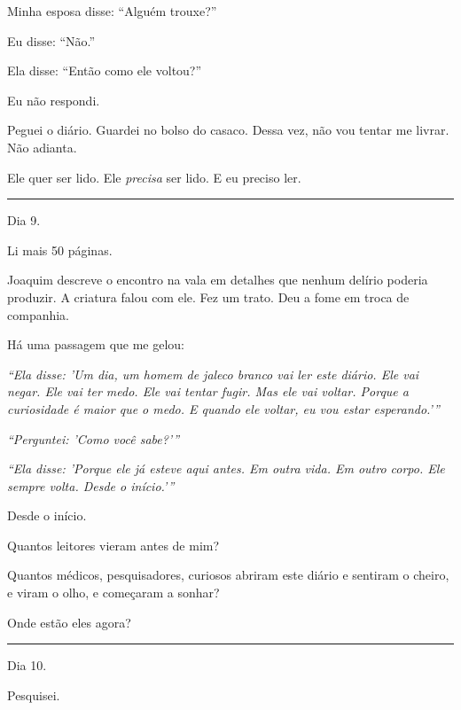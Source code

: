 \noindent Minha esposa disse: \textquotedblleft{}Alguém trouxe?\textquotedblright{}

\noindent Eu disse: \textquotedblleft{}Não.\textquotedblright{}

\noindent Ela disse: \textquotedblleft{}Então como ele voltou?\textquotedblright{}

\noindent Eu não respondi.

\noindent Peguei o diário. Guardei no bolso do casaco. Dessa vez, não vou tentar me livrar. Não adianta.

\noindent Ele quer ser lido.
Ele \textit{precisa} ser lido.
E eu preciso ler.

\vspace{0.5em}\noindent\rule{\textwidth}{0.5pt}\vspace{0.5em}

\noindent Dia 9.

\noindent Li mais 50 páginas.

\noindent Joaquim descreve o encontro na vala em detalhes que nenhum delírio poderia produzir. A criatura falou com ele. Fez um trato. Deu a fome em troca de companhia.

\noindent Há uma passagem que me gelou:

\noindent \textit{\textquotedblleft{}Ela disse: 'Um dia, um homem de jaleco branco vai ler este diário. Ele vai negar. Ele vai ter medo. Ele vai tentar fugir. Mas ele vai voltar. Porque a curiosidade é maior que o medo. E quando ele voltar, eu vou estar esperando.'\textquotedblright{}}

\noindent \textit{\textquotedblleft{}Perguntei: 'Como você sabe?'\textquotedblright{}}

\noindent \textit{\textquotedblleft{}Ela disse: 'Porque ele já esteve aqui antes. Em outra vida. Em outro corpo. Ele sempre volta. Desde o início.'\textquotedblright{}}

\noindent Desde o início.

\noindent Quantos leitores vieram antes de mim?

\noindent Quantos médicos, pesquisadores, curiosos abriram este diário e sentiram o cheiro, e viram o olho, e começaram a sonhar?

\noindent Onde estão eles agora?

\vspace{0.5em}\noindent\rule{\textwidth}{0.5pt}\vspace{0.5em}

\noindent Dia 10.

\noindent Pesquisei.

